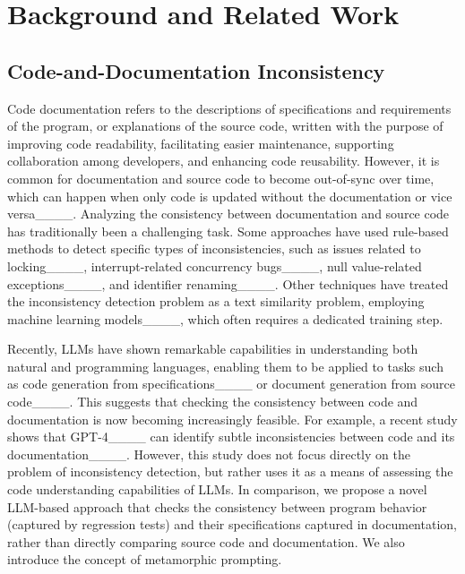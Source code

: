 \section{Background and Related Work}
\label{sec:background}



\subsection{Code-and-Documentation Inconsistency}

Code documentation refers to the descriptions of specifications and requirements of the program, or explanations of the source code, written with the purpose of improving code readability, facilitating easier maintenance, supporting collaboration among developers, and enhancing code reusability. However, it is common for documentation and source code to become out-of-sync over time, which can happen when only code is updated without the documentation or vice versa____. Analyzing the consistency between documentation and source code has traditionally been a challenging task. Some approaches have used rule-based methods to detect specific types of inconsistencies, such as issues related to locking____, interrupt-related concurrency bugs____, null value-related exceptions____, and identifier renaming____. Other techniques have treated the inconsistency detection problem as a text similarity problem, employing machine learning models____, which often requires a dedicated training step.

Recently, LLMs have shown remarkable capabilities in understanding both natural and programming languages, enabling them to be applied to tasks such as code generation from specifications____ or document generation from source code____. This suggests that checking the consistency between code and documentation is now becoming increasingly feasible. For example, a recent study shows that GPT-4____ can identify subtle inconsistencies between code and its documentation____. However, this study does not focus directly on the problem of inconsistency detection, but rather uses it as a means of assessing the code understanding capabilities of LLMs. In comparison, we propose a novel LLM-based approach that checks the consistency between program behavior (captured by regression tests) and their specifications captured in documentation, rather than directly comparing source code and documentation. We also introduce the concept of metamorphic prompting. 

